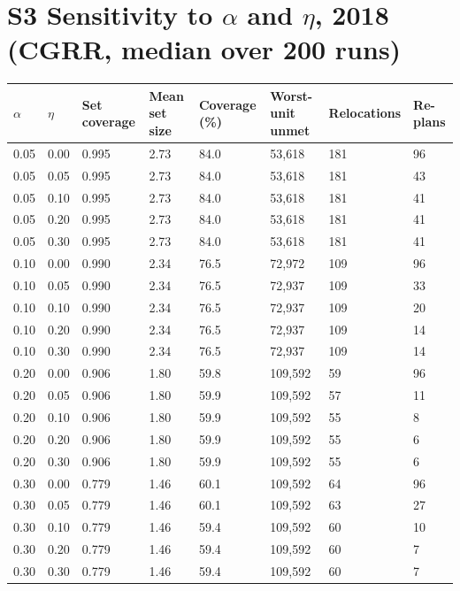 \documentclass[10pt]{article}
\begin{document}
\section*{S3 Sensitivity to $\alpha$ and $\eta$, 2018 (CGRR, median over 200 runs)}\small\begin{longtable}{llllllll}\toprule $\alpha$ & $\eta$ & Set coverage & Mean set size & Coverage (\%) & Worst-unit unmet & Relocations & Re-plans\\\midrule
0.05 & 0.00 & 0.995 & 2.73 & 84.0 & 53,618 & 181 & 96\\
0.05 & 0.05 & 0.995 & 2.73 & 84.0 & 53,618 & 181 & 43\\
0.05 & 0.10 & 0.995 & 2.73 & 84.0 & 53,618 & 181 & 41\\
0.05 & 0.20 & 0.995 & 2.73 & 84.0 & 53,618 & 181 & 41\\
0.05 & 0.30 & 0.995 & 2.73 & 84.0 & 53,618 & 181 & 41\\
0.10 & 0.00 & 0.990 & 2.34 & 76.5 & 72,972 & 109 & 96\\
0.10 & 0.05 & 0.990 & 2.34 & 76.5 & 72,937 & 109 & 33\\
0.10 & 0.10 & 0.990 & 2.34 & 76.5 & 72,937 & 109 & 20\\
0.10 & 0.20 & 0.990 & 2.34 & 76.5 & 72,937 & 109 & 14\\
0.10 & 0.30 & 0.990 & 2.34 & 76.5 & 72,937 & 109 & 14\\
0.20 & 0.00 & 0.906 & 1.80 & 59.8 & 109,592 & 59 & 96\\
0.20 & 0.05 & 0.906 & 1.80 & 59.9 & 109,592 & 57 & 11\\
0.20 & 0.10 & 0.906 & 1.80 & 59.9 & 109,592 & 55 & 8\\
0.20 & 0.20 & 0.906 & 1.80 & 59.9 & 109,592 & 55 & 6\\
0.20 & 0.30 & 0.906 & 1.80 & 59.9 & 109,592 & 55 & 6\\
0.30 & 0.00 & 0.779 & 1.46 & 60.1 & 109,592 & 64 & 96\\
0.30 & 0.05 & 0.779 & 1.46 & 60.1 & 109,592 & 63 & 27\\
0.30 & 0.10 & 0.779 & 1.46 & 59.4 & 109,592 & 60 & 10\\
0.30 & 0.20 & 0.779 & 1.46 & 59.4 & 109,592 & 60 & 7\\
0.30 & 0.30 & 0.779 & 1.46 & 59.4 & 109,592 & 60 & 7\\
\bottomrule\end{longtable}\normalsize
\end{document}
